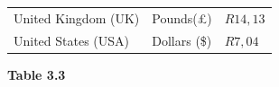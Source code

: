 \begin{enumerate}[noitemsep, label=\textbf{\arabic*}. ]
{{\begin{center}
\begin{tabular}[t]{|l|l|l|}
    
        United Kingdom (UK) &
    
    
        Pounds(£) &
    
    
        \begin{math}R14,13\end{math}%
     \tabularnewline\cline{1-1}\cline{2-2}\cline{3-3}
    
    
        United States (USA) &
    
    
        Dollars (\$) &
    
    
        \begin{math}R7,04\end{math}%
     \tabularnewline\cline{1-1}\cline{2-2}\cline{3-3}
    \end{tabular}
      \end{center}
    \begin{center}{\small\bfseries Table 3.3}\end{center}
    
    \addtocounter{footnote}{-0}
    
}}
\end{enumerate}
